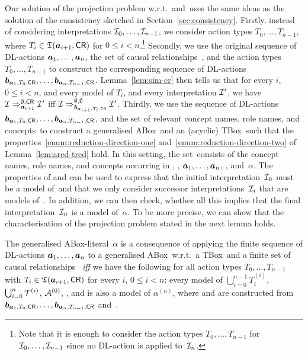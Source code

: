 Our solution of the projection problem w.r.t.~\Tmc and~\CR uses the same ideas
as the solution of the consistency sketched in Section~\ref{sec:consistency}.
%
Firstly, instead of considering interpretations $\mathcal{I}_0,\dots,\mathcal{I}_{n-1}$, we
consider action types $T_0,\dots,T_{n-1}$, where $T_i\in\mathfrak{T}(\boldsymbol a_{i+1},\mathsf{CR})$
for $0\le i<n$.\footnote{%
    Note that it is enough to consider the action types $T_0,\dots,T_{n-1}$ for
    $\mathcal{I}_0,\dots,\mathcal{I}_{n-1}$ since no DL-action is applied to~$\mathcal{I}_n$.}
%
Secondly, we use the original sequence of DL-actions $\boldsymbol a_1,\dots,\boldsymbol a_n$, the
set of causal relationships~\CR, and the action types $T_0,\dots,T_{n-1}$ to
construct the corresponding sequence of DL-actions
$\boldsymbol b_{\boldsymbol a_1,T_0,\mathsf{CR}},\dots,\boldsymbol b_{\boldsymbol a_n,T_{n-1},\mathsf{CR}}$.
Lemma~\ref{lem:sim-cr} then tells us that for every $i$, $0\le i<n$, and every
model \Imc of $T_i$, and every interpretation $\mathcal{I}'$, we have
$\mathcal{I}\Rightarrow_{\boldsymbol a_{i+1}}^{\emptyset,\mathsf{CR}}\mathcal{I}'$ iff
$\mathcal{I}\Rightarrow_{\boldsymbol b_{\boldsymbol a_{i+1},T_i,\mathsf{CR}}}^{\emptyset,\emptyset}\mathcal{I}'$.
%
Thirdly, we use the sequence of DL-actions
$\boldsymbol b_{\boldsymbol a_1,T_0,\mathsf{CR}},\dots,\boldsymbol b_{\boldsymbol a_n,T_{n-1},\mathsf{CR}}$, and the set of
relevant concept names, role names, and concepts~\Rmc to construct a generalised
ABox~\Ared and an (acyclic) TBox~\Tred such that the
properties~\eqref{enum:reduction-direction-one}
and~\eqref{enum:reduction-direction-two} of Lemma~\ref{lem:ared-tred} hold.  In
this setting, the set~\Rmc consists of the concept names, role names, and
concepts occurring in \Amc, \Tmc, $\boldsymbol a_1,\dots,\boldsymbol a_n$, \CR, and~$\alpha$.
%
The properties of \Ared and \Tred can be used to express that the initial
interpretation~$\mathcal{I}_0$ must be a model of~\Amc and that we only consider
successor interpretations~$\mathcal{I}_i$ that are models of~\Tmc.  In addition, we can
then check, whether all this implies that the final interpretation~$\mathcal{I}_n$ is a
model of~$\alpha$.
%
To be more precise, we can show that the characterisation of the projection
problem stated in the next lemma holds.

\begin{lemma}\label{lem:projection}
    The generalised ABox-literal~$\alpha$ is a consequence of applying the
    finite sequence of DL-actions $\boldsymbol a_1,\dots,\boldsymbol a_n$ to a generalised
    ABox~\Amc w.r.t.\ a TBox~\Tmc and a finite set of causal relationships~\CR
    \emph{iff} we have the following for all action types $T_0,\dots,T_{n-1}$
    with $T_i\in\mathfrak{T}(\boldsymbol a_{i+1},\mathsf{CR})$ for every $i$, $0\le i<n$: every model of
    $\bigcup_{i=0}^{n-1}T_i^{(i)}$, $\bigcup_{i=0}^n\mathcal{T}^{(i)}$, $\mathcal{A}^{(0)}$,
    \Ared, and \Tred is also a model of $\alpha^{(n)}$, where \Ared and \Tred
    are constructed from
    $\boldsymbol b_{\boldsymbol a_1,T_0,\mathsf{CR}},\dots,\boldsymbol b_{\boldsymbol a_n,T_{n-1},\mathsf{CR}}$ and~\Rmc.
\end{lemma}

